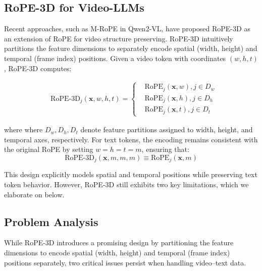 \documentclass[11pt]{article}
\begin{document}
\subsection{RoPE-3D for Video-LLMs}

Recent approaches, such as M-RoPE in Qwen2-VL\cite{wang2024qwen2}, have proposed RoPE-3D as an extension of RoPE for video structure preserving. RoPE-3D intuitively partitions the feature dimensions to separately encode spatial (width, height) and temporal (frame index) positions.
Given a video token with coordinates $ (w, h, t) $, RoPE-3D computes:

\begin{small}
\begin{equation}
\label{eq:rope3d}
\begin{aligned}
& \text{RoPE-3D}_{j}(\mathbf{x}, w, h, t) = \left\{
\begin{aligned}
& \text{RoPE}_{j}(\mathbf{x}, w ), j \in D_{w} \\
& \text{RoPE}_{j}(\mathbf{x}, h ), j \in D_{h} \\
& \text{RoPE}_{j}(\mathbf{x}, t ), j \in D_{t}
\end{aligned}
\right.
\end{aligned}
\end{equation}
\end{small}

\noindent where where $ D_w, D_h, D_t$ denote feature partitions assigned to width, height, and temporal axes, respectively. 
For text tokens, the encoding remains consistent with the original RoPE by setting $w = h = t = m$, ensuring that:  
\begin{equation}
\label{eq:text_inv}
\text{RoPE-3D}_{j}(\mathbf{x}, m, m, m) \equiv \text{RoPE}_{j}(\mathbf{x}, m)
\end{equation}

This design explicitly models spatial and temporal positions while preserving text token behavior. However, RoPE-3D still exhibits two key limitations, which we elaborate on below.

\subsection{Problem Analysis}
\label{sec:problem}
While RoPE-3D introduces a promising design by partitioning the feature dimensions to encode spatial (width, height) and temporal (frame index) positions separately, two critical issues persist when handling video–text data.
\end{document}
